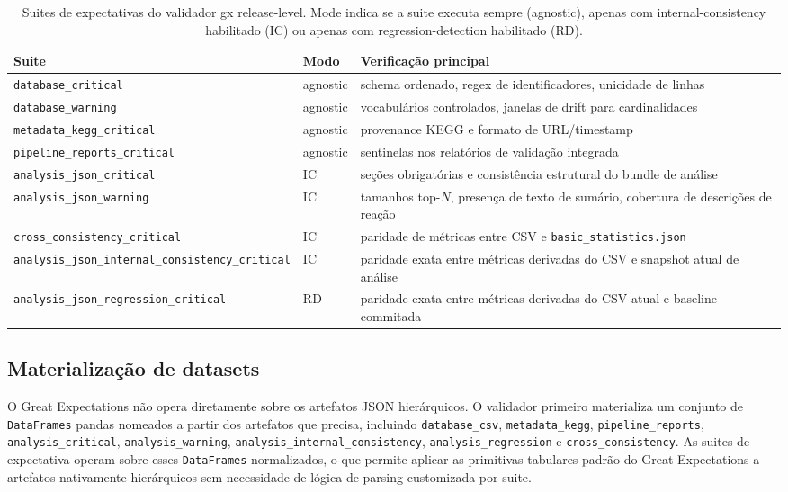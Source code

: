\begin{table}[htbp]
\centering
\caption{Suites de expectativas do validador \gls{gx} release-level. Mode indica se a suite executa sempre (agnostic), apenas com internal-consistency habilitado (IC) ou apenas com regression-detection habilitado (RD).}
\label{tab:c1-suites}
\small
\begin{tabular}{@{}p{6cm}lp{7cm}@{}}
\toprule
\textbf{Suite} & \textbf{Modo} & \textbf{Verificação principal} \\
\midrule
\texttt{database\_critical}                              & agnostic & schema ordenado, regex de identificadores, unicidade de linhas \\
\texttt{database\_warning}                               & agnostic & vocabulários controlados, janelas de drift para cardinalidades \\
\texttt{metadata\_kegg\_critical}                        & agnostic & provenance KEGG e formato de URL/timestamp \\
\texttt{pipeline\_reports\_critical}                     & agnostic & sentinelas nos relatórios de validação integrada \\
\texttt{analysis\_json\_critical}                        & IC       & seções obrigatórias e consistência estrutural do bundle de análise \\
\texttt{analysis\_json\_warning}                         & IC       & tamanhos top-$N$, presença de texto de sumário, cobertura de descrições de reação \\
\texttt{cross\_consistency\_critical}                    & IC       & paridade de métricas entre CSV e \texttt{basic\_statistics.json} \\
\texttt{analysis\_json\_internal\_consistency\_critical} & IC       & paridade exata entre métricas derivadas do CSV e snapshot atual de análise \\
\texttt{analysis\_json\_regression\_critical}            & RD       & paridade exata entre métricas derivadas do CSV atual e baseline commitada \\
\bottomrule
\end{tabular}
\end{table}

\subsection{Materialização de datasets}

O Great Expectations não opera diretamente sobre os artefatos JSON hierárquicos. O validador primeiro materializa um conjunto de \texttt{DataFrames} pandas nomeados a partir dos artefatos que precisa, incluindo \texttt{database\_csv}, \texttt{metadata\_kegg}, \texttt{pipeline\_reports}, \texttt{analysis\_critical}, \texttt{analysis\_warning}, \texttt{analysis\_internal\_consistency}, \texttt{analysis\_regression} e \texttt{cross\_consistency}. As suites de expectativa operam sobre esses \texttt{DataFrames} normalizados, o que permite aplicar as primitivas tabulares padrão do Great Expectations a artefatos nativamente hierárquicos sem necessidade de lógica de parsing customizada por suite.

